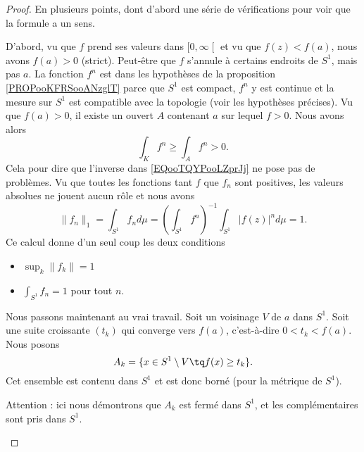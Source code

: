 \begin{proof}
	En plusieurs points, dont d'abord une série de vérifications pour voir que la formule a un sens.
	\begin{subproof}
		D'abord, vu que \( f\) prend ses valeurs dans \( \mathopen[ 0 , \infty \mathclose[\) et vu que \( f(z)<f(a)\), nous avons \( f(a)>0\) (strict). Peut-être que \( f\) s'annule à certains endroits de \( S^1\), mais pas \( a\).
		La fonction \( f^n\) est dans les hypothèses de la proposition \ref{PROPooKFRSooANzglT} parce que \( S^1\) est compact, \( f^n\) y est continue et la mesure sur \( S^1\) est compatible avec la topologie (voir les hypothèses précises).
		Vu que \( f(a)>0\), il existe un ouvert \( A\) contenant \( a\) sur lequel \( f>0\). Nous avons alors
		\begin{equation}
			\int_Kf^n\geq \int_Af^n>0.
		\end{equation}
		Cela pour dire que l'inverse dans \eqref{EQooTQYPooLZprJj} ne pose pas de problèmes.
		\spitem[Norme]
		Vu que toutes les fonctions tant \( f\) que \( f_n\) sont positives, les valeurs absolues ne jouent aucun rôle et nous avons
		\begin{equation}
			\| f_n \|_1=\int_{S^1}f_nd\mu=\left( \int_{S^1}f^n \right)^{-1}\int_{S^1}| f(z) |^nd\mu=1.
		\end{equation}
		Ce calcul donne d'un seul coup les deux conditions
		\begin{itemize}
			\item \( \sup_k\| f_k \|=1\)
			\item \( \int_{S^1}f_n=1\) pour tout \( n\).
		\end{itemize}
	\end{subproof}
	Nous passons maintenant au vrai travail.
	Soit un voisinage \( V\) de \( a\) dans \( S^1\). Soit une suite croissante \( (t_k)\) qui converge vers \( f(a)\), c'est-à-dire \( 0<t_k<f(a)\). Nous posons
	\begin{equation}
		A_k=\{ x\in S^1\setminus V\tq f(x)\geq t_k \}.
	\end{equation}
	Cet ensemble est contenu dans \( S^1\) et est donc borné (pour la métrique de \( S^1\)).
	\begin{subproof}
		Attention : ici nous démontrons que \( A_k\) est fermé dans \( S^1\), et les complémentaires sont pris dans \( S^1\).


\end{subproof}
\end{proof}
